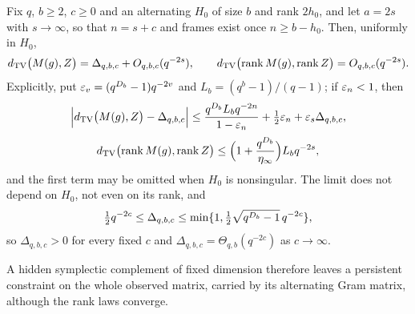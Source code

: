 \begin{theorem}\label{spn:thm:complement-boundary}
Fix $q$, $b\ge2$, $c\ge0$ and an alternating $H_0$ of size $b$ and rank $2h_0$, and let
$a=2s$ with $s\to\infty$, so that $n=s+c$ and frames exist once $n\ge b-h_0$. Then, uniformly
in $H_0$,
\[
 d_{\mathrm{TV}}\bigl(M(g),Z\bigr)=\Delta_{q,b,c}+O_{q,b,c}(q^{-2s}),\qquad
 d_{\mathrm{TV}}\bigl(\operatorname{rank} M(g),\operatorname{rank} Z\bigr)=O_{q,b,c}(q^{-2s}).
\]
Explicitly, put $\varepsilon_v=(q^{D_b}-1)q^{-2v}$ and $L_b=(q^b-1)/(q-1)$; if $\varepsilon_n<1$, then
\[
 \Bigl|d_{\mathrm{TV}}\bigl(M(g),Z\bigr)-\Delta_{q,b,c}\Bigr|
 \le\frac{q^{D_b}L_bq^{-2n}}{1-\varepsilon_n}+\tfrac12\varepsilon_n+\varepsilon_s\Delta_{q,b,c},
\]
\[
 d_{\mathrm{TV}}\bigl(\operatorname{rank} M(g),\operatorname{rank} Z\bigr)\le\Bigl(1+\frac{q^{D_b}}{\eta_\infty}\Bigr)L_bq^{-2s},
\]
and the first term may be omitted when $H_0$ is nonsingular. The limit does not depend on
$H_0$, not even on its rank, and
\[
 \tfrac12q^{-2c}\le\Delta_{q,b,c}\le\min\{1,\tfrac12\sqrt{q^{D_b}-1}\,q^{-2c}\} ,
\]
so $\Delta_{q,b,c}>0$ for every fixed $c$ and $\Delta_{q,b,c}=\Theta_{q,b}(q^{-2c})$ as
$c\to\infty$.
\end{theorem}

A hidden symplectic complement of fixed dimension therefore leaves a persistent constraint on
the whole observed matrix, carried by its alternating Gram matrix, although the rank laws
converge.


